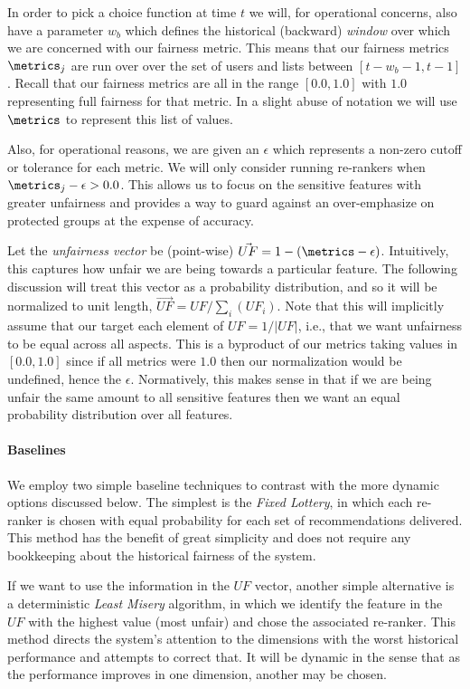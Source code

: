 In order to pick a choice function at time $t$ we will, for operational concerns, also have a parameter $w_b$ which defines the historical (backward) \emph{window} over which we are concerned with our fairness metric.  This means that our fairness metrics $\metrics_j$ are run over over the set of users and lists between $[t - w_b - 1, t-1]$.  Recall that our fairness metrics are all in the range $[0.0, 1.0]$ with $1.0$ representing full fairness for that metric.  In a slight abuse of notation we will use $\metrics$ to represent this list of values.

Also, for operational reasons, we are given an $\epsilon$ which represents a non-zero cutoff or tolerance for each metric.  We will only consider running re-rankers when $\metrics_j - \epsilon > 0.0$. This allows us to focus on the sensitive features with greater unfairness and provides a way to guard against an over-emphasize on protected groups at the expense of accuracy.

Let the \emph{unfairness vector} be (point-wise) $\vec{UF} = 1 - (\metrics - \epsilon)$.  Intuitively, this captures how unfair we are being towards a particular feature.  The following discussion will treat this vector as a probability distribution, and so it will be normalized to unit length, $\vec{UF} = UF / \sum_i(UF_i)$. Note that this will implicitly assume that our target each element of $UF = 1/|UF|$, i.e., that we want unfairness to be equal across all aspects.  This is a byproduct of our metrics taking values in $[0.0,1.0]$ since if all metrics were $1.0$ then our normalization would be undefined, hence the $\epsilon$.  Normatively, this makes sense in that if we are being unfair the same amount to all sensitive features then we want an equal probability distribution over all features.


\noindent \paragraph{Baselines} \newline
\indent We employ two simple baseline techniques to contrast with the more dynamic options discussed below. The simplest is the \textit{Fixed Lottery}, in which each re-ranker is chosen with equal probability for each set of recommendations delivered. This method has the benefit of great simplicity and does not require any bookkeeping about the historical fairness of the system. 

If we want to use the information in the $UF$ vector, another simple alternative is a deterministic \textit{Least Misery} algorithm, in which we identify the feature in the $UF$ with the highest value (most unfair) and chose the associated re-ranker. This method directs the system's attention to the dimensions with the worst historical performance and attempts to correct that. It will be dynamic in the sense that as the performance improves in one dimension, another may be chosen.


